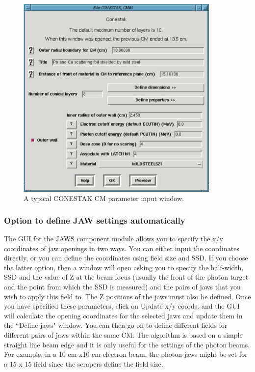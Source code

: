 \documentclass[12pt,twoside]{article}
\begin{document}
\begin{figure}[htb]
\begin{center}
\leavevmode
\includegraphics[width=10cm]{figures/conestak}
\end{center}
\caption{A typical CONESTAK CM parameter input window.\label{conestak}}
\end{figure}

\subsubsection{Option to define JAW settings automatically}

The GUI for the JAWS component module allows you to specify the
x/y coordinates of jaw openings in two ways.  You can either input
the coordinates directly, or you can define the coordinates using
field size and SSD.  If you choose the latter option, then a window
will open asking you to specify the half-width, SSD
and the value of Z at the beam focus (usually the front of the photon
target and the point from which the SSD is measured) and
the pairs of jaws that you wish to apply this field to. The Z positions of
the jaws must also be defined.  Once you
have specified these parameters, click on {\sf Update x/y coords.} and
the GUI will calculate the opening coordinates for the selected
jaws and update them
in the ``Define jaws" window.  You can then go on to define different
fields for different pairs of jaws within the same CM.  The algorithm is
based on a simple straight line beam edge and it is only useful for the
settings of the photon beams.  For example, in a 10 cm x10 cm electron beam,
the photon jaws might be set for a 15 x 15 field since the scrapers define
the field size.
\end{document}
